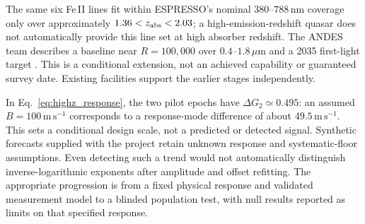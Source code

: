 The same six Fe\,II lines fit within ESPRESSO's nominal $380$--$788$\,nm coverage \cite{ESOESPRESSO2026} only over approximately $1.36<z_{\rm abs}<2.03$; a high-emission-redshift quasar does not automatically provide this line set at high absorber redshift. The ANDES team describes a baseline near $R=100{,}000$ over $0.4$--$1.8\,\mu$m and a 2035 first-light target \cite{NDiaye2026ANDES}. This is a conditional extension, not an achieved capability or guaranteed survey date. Existing facilities support the earlier stages independently.

In Eq.~\eqref{eq:highz_response}, the two pilot epochs have $\Delta G_2\simeq0.495$: an assumed $B=100\,\mathrm{m\,s^{-1}}$ corresponds to a response-mode difference of about $49.5\,\mathrm{m\,s^{-1}}$. This sets a conditional design scale, not a predicted or detected signal. Synthetic forecasts supplied with the project retain unknown response and systematic-floor assumptions. Even detecting such a trend would not automatically distinguish inverse-logarithmic exponents after amplitude and offset refitting. The appropriate progression is from a fixed physical response and validated measurement model to a blinded population test, with null results reported as limits on that specified response.
